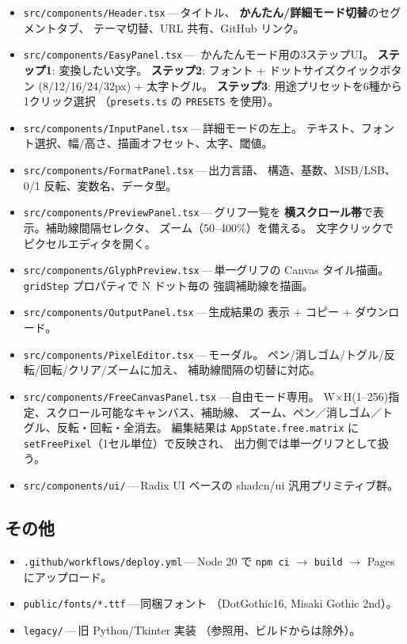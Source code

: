 \begin{itemize}[leftmargin=*,itemsep=2pt]
  \item \texttt{src/components/Header.tsx}\,---\,タイトル、
        \textbf{かんたん/詳細モード切替}のセグメントタブ、
        テーマ切替、URL 共有、GitHub リンク。
  \item \texttt{src/components/EasyPanel.tsx}\,---\,
        かんたんモード用の3ステップUI。
        \textbf{ステップ1}: 変換したい文字。
        \textbf{ステップ2}: フォント + ドットサイズクイックボタン
        (8/12/16/24/32px) + 太字トグル。
        \textbf{ステップ3}: 用途プリセットを6種から1クリック選択
        （\texttt{presets.ts} の \texttt{PRESETS} を使用）。
  \item \texttt{src/components/InputPanel.tsx}\,---\,詳細モードの左上。
        テキスト、フォント選択、幅/高さ、描画オフセット、太字、閾値。
  \item \texttt{src/components/FormatPanel.tsx}\,---\,出力言語、
        構造、基数、MSB/LSB、0/1 反転、変数名、データ型。
  \item \texttt{src/components/PreviewPanel.tsx}\,---\,グリフ一覧を
        \textbf{横スクロール帯}で表示。補助線間隔セレクタ、
        ズーム（50--400\%）を備える。
        文字クリックでピクセルエディタを開く。
  \item \texttt{src/components/GlyphPreview.tsx}\,---\,単一グリフの
        Canvas タイル描画。\texttt{gridStep} プロパティで N ドット毎の
        強調補助線を描画。
  \item \texttt{src/components/OutputPanel.tsx}\,---\,生成結果の
        表示 + コピー + ダウンロード。
  \item \texttt{src/components/PixelEditor.tsx}\,---\,モーダル。
        ペン/消しゴム/トグル/反転/回転/クリア/ズームに加え、
        補助線間隔の切替に対応。
  \item \texttt{src/components/FreeCanvasPanel.tsx}\,---\,自由モード専用。
        W$\times$H(1--256)指定、スクロール可能なキャンバス、補助線、
        ズーム、ペン／消しゴム／トグル、反転・回転・全消去。
        編集結果は \texttt{AppState.free.matrix} に
        \texttt{setFreePixel}（1セル単位）で反映され、
        出力側では単一グリフとして扱う。
  \item \texttt{src/components/ui/}\,---\,Radix UI ベースの
        shadcn/ui 汎用プリミティブ群。
\end{itemize}

\subsection{その他}

\begin{itemize}[leftmargin=*,itemsep=2pt]
  \item \texttt{.github/workflows/deploy.yml}\,---\,Node 20 で
        \texttt{npm ci} $\rightarrow$ \texttt{build} $\rightarrow$
        Pages にアップロード。
  \item \texttt{public/fonts/*.ttf}\,---\,同梱フォント
        （DotGothic16, Misaki Gothic 2nd）。
  \item \texttt{legacy/}\,---\,旧 Python/Tkinter 実装
        （参照用、ビルドからは除外）。
\end{itemize}

\newpage

